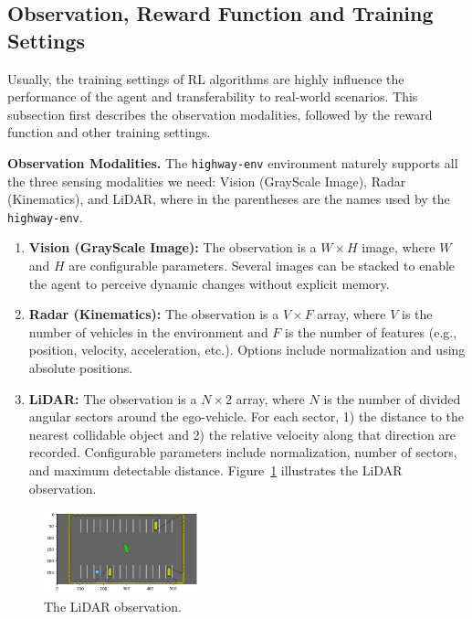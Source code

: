 \documentclass{article}
\begin{document}
\subsection{Observation, Reward Function and Training Settings}

Usually, the training settings of RL algorithms are highly influence the performance of the agent and transferability to real-world scenarios. This subsection first describes the observation modalities, followed by the reward function and other training settings.

\textbf{Observation Modalities.} The \texttt{highway-env} environment naturely supports all the three sensing modalities we need: Vision (GrayScale Image), Radar (Kinematics), and LiDAR, where in the parentheses are the names used by the \texttt{highway-env}.

\begin{enumerate}
  \item \textbf{Vision (GrayScale Image):} The observation is a $W \times H$ image, where $W$ and $H$ are configurable parameters. Several images can be stacked to enable the agent to perceive dynamic changes without explicit memory.
  \item \textbf{Radar (Kinematics):} The observation is a $V \times F$ array, where $V$ is the number of vehicles in the environment and $F$ is the number of features (e.g., position, velocity, acceleration, etc.). Options include normalization and using absolute positions.
  \item \textbf{LiDAR:} The observation is a $N \times 2$ array, where $N$ is the number of divided angular sectors around the ego-vehicle. For each sector, 1) the distance to the nearest collidable object and 2) the relative velocity along that direction are recorded. Configurable parameters include normalization, number of sectors, and maximum detectable distance. Figure~\ref{fig:lidar} illustrates the LiDAR observation.
\end{enumerate}

\begin{figure}[h]
  \centering
  \includegraphics[width=0.4\textwidth]{./pics/lidar.png}
  \caption{The LiDAR observation.}
  \label{fig:lidar}
\end{figure}
\end{document}
